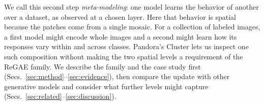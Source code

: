 We call this second step \emph{meta-modeling}: one model learns the behavior of another over a dataset, as observed at a chosen layer. Here that behavior is spatial because the patches come from a single mosaic. For a collection of labeled images, a first model might encode whole images and a second might learn how its responses vary within and across classes. Pandora's Cluster lets us inspect one such composition without making the two spatial levels a requirement of the ReGAE family. We describe the family and the case study first (Secs.~\ref{sec:method}--\ref{sec:evidence}), then compare the update with other generative models and consider what further levels might capture (Secs.~\ref{sec:related}--\ref{sec:discussion}).
